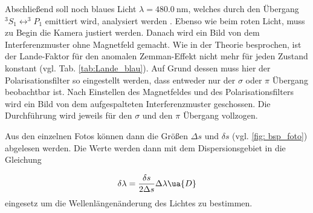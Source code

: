 Abschließend soll noch blaues Licht $\lambda=\SI{480.0}{\nm}$, welches durch den Übergang $^3S_1\leftrightarrow ^3\!\!P_1$ emittiert wird,
analysiert werden \cite{anleitung27}. Ebenso wie beim roten Licht, muss zu Begin die Kamera justiert werden.
Danach wird ein Bild von dem Interferenzmuster ohne Magnetfeld gemacht. Wie in der Theorie besprochen, ist der
Lande-Faktor für den anomalen Zemman-Effekt nicht mehr für jeden Zustand konstant (vgl. Tab. \ref{tab:Lande_blau}). Auf Grund dessen muss hier der Polarisationsfilter
so eingestellt werden, dass entweder nur der $\sigma$ oder $\pi$ Übergang beobachtbar ist. Nach Einstellen des Magnetfeldes
und des Polarisationsfilters wird ein Bild von dem aufgespalteten Interferenzmuster geschossen. Die Durchführung wird jeweils
 für den $\sigma$ und den $\pi$ Übergang vollzogen.

Aus den einzelnen Fotos können dann die Größen $\Delta s$ und $\delta s$ (vgl. \ref{fig: bsp_foto}) abgelesen werden.
Die Werte werden dann mit dem Dispersionsgebiet in die Gleichung

\begin{equation}
  \label{eq: wellen_änderung}
  \delta \lambda=\frac{\delta s}{2\Delta s} \Delta \lambda\ua{D}
\end{equation}
eingesetz um die Wellenlängenänderung des Lichtes zu bestimmen.

